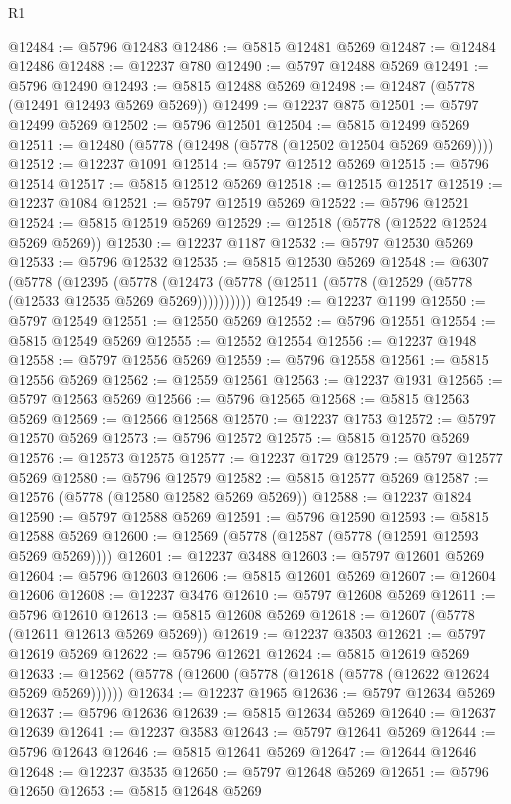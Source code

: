 \begin{lexlean}{R1}
\begin{coremodule}
@12484 := @5796 @12483
@12486 := @5815 @12481 @5269
@12487 := @12484 @12486
@12488 := @12237 @780
@12490 := @5797 @12488 @5269
@12491 := @5796 @12490
@12493 := @5815 @12488 @5269
@12498 := @12487 (@5778 (@12491 @12493 @5269 @5269))
@12499 := @12237 @875
@12501 := @5797 @12499 @5269
@12502 := @5796 @12501
@12504 := @5815 @12499 @5269
@12511 := @12480 (@5778 (@12498 (@5778 (@12502 @12504 @5269 @5269))))
@12512 := @12237 @1091
@12514 := @5797 @12512 @5269
@12515 := @5796 @12514
@12517 := @5815 @12512 @5269
@12518 := @12515 @12517
@12519 := @12237 @1084
@12521 := @5797 @12519 @5269
@12522 := @5796 @12521
@12524 := @5815 @12519 @5269
@12529 := @12518 (@5778 (@12522 @12524 @5269 @5269))
@12530 := @12237 @1187
@12532 := @5797 @12530 @5269
@12533 := @5796 @12532
@12535 := @5815 @12530 @5269
@12548 := @6307
    (@5778
      (@12395
        (@5778 (@12473 (@5778 (@12511 (@5778 (@12529 (@5778 (@12533 @12535 @5269 @5269))))))))))
@12549 := @12237 @1199
@12550 := @5797 @12549
@12551 := @12550 @5269
@12552 := @5796 @12551
@12554 := @5815 @12549 @5269
@12555 := @12552 @12554
@12556 := @12237 @1948
@12558 := @5797 @12556 @5269
@12559 := @5796 @12558
@12561 := @5815 @12556 @5269
@12562 := @12559 @12561
@12563 := @12237 @1931
@12565 := @5797 @12563 @5269
@12566 := @5796 @12565
@12568 := @5815 @12563 @5269
@12569 := @12566 @12568
@12570 := @12237 @1753
@12572 := @5797 @12570 @5269
@12573 := @5796 @12572
@12575 := @5815 @12570 @5269
@12576 := @12573 @12575
@12577 := @12237 @1729
@12579 := @5797 @12577 @5269
@12580 := @5796 @12579
@12582 := @5815 @12577 @5269
@12587 := @12576 (@5778 (@12580 @12582 @5269 @5269))
@12588 := @12237 @1824
@12590 := @5797 @12588 @5269
@12591 := @5796 @12590
@12593 := @5815 @12588 @5269
@12600 := @12569 (@5778 (@12587 (@5778 (@12591 @12593 @5269 @5269))))
@12601 := @12237 @3488
@12603 := @5797 @12601 @5269
@12604 := @5796 @12603
@12606 := @5815 @12601 @5269
@12607 := @12604 @12606
@12608 := @12237 @3476
@12610 := @5797 @12608 @5269
@12611 := @5796 @12610
@12613 := @5815 @12608 @5269
@12618 := @12607 (@5778 (@12611 @12613 @5269 @5269))
@12619 := @12237 @3503
@12621 := @5797 @12619 @5269
@12622 := @5796 @12621
@12624 := @5815 @12619 @5269
@12633 := @12562 (@5778 (@12600 (@5778 (@12618 (@5778 (@12622 @12624 @5269 @5269))))))
@12634 := @12237 @1965
@12636 := @5797 @12634 @5269
@12637 := @5796 @12636
@12639 := @5815 @12634 @5269
@12640 := @12637 @12639
@12641 := @12237 @3583
@12643 := @5797 @12641 @5269
@12644 := @5796 @12643
@12646 := @5815 @12641 @5269
@12647 := @12644 @12646
@12648 := @12237 @3535
@12650 := @5797 @12648 @5269
@12651 := @5796 @12650
@12653 := @5815 @12648 @5269

\end{coremodule}
\end{lexlean}
